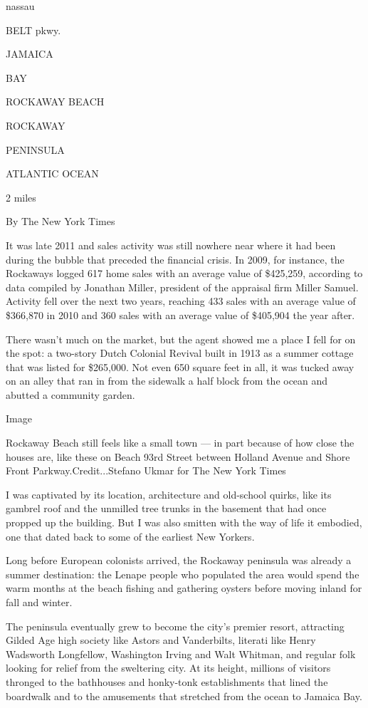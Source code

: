nassau

BELT pkwy.

JAMAICA

BAY

ROCKAWAY BEACH

ROCKAWAY

PENINSULA

ATLANTIC OCEAN

2 miles

By The New York Times

It was late 2011 and sales activity was still nowhere near where it had
been during the bubble that preceded the financial crisis. In 2009, for
instance, the Rockaways logged 617 home sales with an average value of
\$425,259, according to data compiled by Jonathan Miller, president of
the appraisal firm Miller Samuel. Activity fell over the next two years,
reaching 433 sales with an average value of \$366,870 in 2010 and 360
sales with an average value of \$405,904 the year after.

There wasn't much on the market, but the agent showed me a place I fell
for on the spot: a two-story Dutch Colonial Revival built in 1913 as a
summer cottage that was listed for \$265,000. Not even 650 square feet
in all, it was tucked away on an alley that ran in from the sidewalk a
half block from the ocean and abutted a community garden.

Image

Rockaway Beach still feels like a small town --- in part because of how
close the houses are, like these on Beach 93rd Street between Holland
Avenue and Shore Front Parkway.Credit...Stefano Ukmar for The New York
Times

I was captivated by its location, architecture and old-school quirks,
like its gambrel roof and the unmilled tree trunks in the basement that
had once propped up the building. But I was also smitten with the way of
life it embodied, one that dated back to some of the earliest New
Yorkers.

Long before European colonists arrived, the Rockaway peninsula was
already a summer destination: the Lenape people who populated the area
would spend the warm months at the beach fishing and gathering oysters
before moving inland for fall and winter.

The peninsula eventually grew to become the city's premier resort,
attracting Gilded Age high society like Astors and Vanderbilts, literati
like Henry Wadsworth Longfellow, Washington Irving and Walt Whitman, and
regular folk looking for relief from the sweltering city. At its height,
millions of visitors thronged to the bathhouses and honky-tonk
establishments that lined the boardwalk and to the amusements that
stretched from the ocean to Jamaica Bay.

